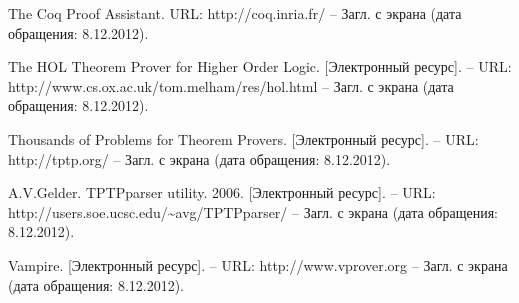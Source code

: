 \begin{thebibliography}{99}
 The Coq Proof Assistant. URL: http://coq.inria.fr/ -- Загл. с экрана (дата обращения: 8.12.2012).

 The HOL Theorem Prover for Higher Order Logic. [Электронный ресурс]. -- URL: http://www.cs.ox.ac.uk/tom.melham/res/hol.html -- Загл. с экрана (дата обращения: 8.12.2012).

 Thousands of Problems for Theorem Provers. [Электронный ресурс]. -- URL: http://tptp.org/ -- Загл. с экрана (дата обращения: 8.12.2012).

 A.V.Gelder. TPTPparser utility. 2006. [Электронный ресурс]. -- URL: http://users.soe.ucsc.edu/\~{}avg/TPTPparser/ -- Загл. с экрана (дата обращения: 8.12.2012).

 Vampire. [Электронный ресурс]. -- URL: http://www.vprover.org -- Загл. с экрана (дата обращения: 8.12.2012).








\end{thebibliography}



